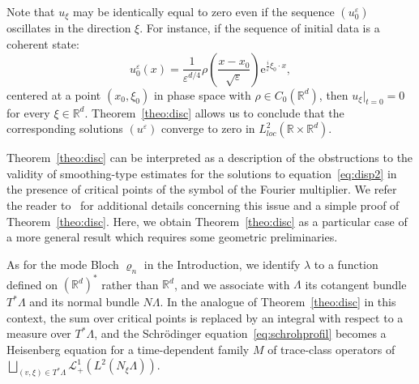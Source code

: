 \documentclass[AHL,Unicode,longabstracts]{cedram}
\newcommand*\R{{\mathbb R}}
\newcommand*\eps{\varepsilon}
\newcommand*\loc{loc}
\numberwithin{equation}{section}
\newcommand{\ee}{{\mathrm e}}
\begin{document}
Note that $u_\xi$ may be identically equal to zero even if the sequence $(u^\eps_0)$ oscillates in the direction $\xi$. For instance, if the sequence of initial data is a coherent state:
\[
u^\eps_0(x)=\frac{1}{\eps^{d/4}}\rho\left(\frac{x-x_0}{\sqrt{\eps}}\right){\ee}^{\frac{i}{\eps}\xi_0 \cdot x},
\]
centered at a point $(x_0,\xi_0)$ in phase space with $\rho \in C_0(\R^d)$, then $u_\xi|_{t=0}=0$ for every $\xi\in\R^d$. Theorem~\ref{theo:disc} allows us to conclude that the corresponding solutions $(u^\eps)$ converge to zero in $L^2_{\loc}(\R\times\R^d)$.


Theorem~\ref{theo:disc} can be interpreted as a description of the obstructions to the validity of smoothing-type estimates for the solutions to equation~\eqref{eq:disp2} in the presence of critical points of the symbol of the Fourier multiplier. We refer the reader to~\cite{CFMProc} for additional details concerning this issue and a simple proof of Theorem~\ref{theo:disc}. Here, we obtain Theorem~\ref{theo:disc} as a particular case of a more general result which requires some geometric preliminaries.


As for the mode Bloch $\varrho_n$ in the Introduction, we identify $\lambda$ to a function defined on $(\R^d)^*$ rather than $ \R^d$, and we associate with $\Lambda$ its cotangent bundle $T^*\Lambda$ and its normal bundle $N\Lambda$. In the analogue of Theorem~\ref{theo:disc} in this context, the sum over critical points is replaced by an integral with respect to a measure over $T^*\Lambda$, and the Schr\"odinger equation~\eqref{eq:schrohprofil} becomes a Heisenberg equation for a time-dependent family $M$ of trace-class operators of $\bigsqcup_{(v,\xi)\in T^*\Lambda}{\mathcal L}^1_+\left(L^2(N_\xi\Lambda)\right)$.
\end{document}
